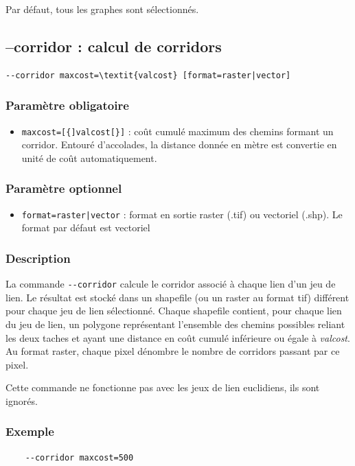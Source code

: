 \documentclass[a4paper,10pt]{report}
\begin{document}
Par défaut, tous les graphes sont sélectionnés.

\subsection{--corridor : calcul de corridors}
\begin{Verbatim}[commandchars=\\\{\}]
--corridor maxcost=\textit{valcost} [format=raster|vector]
\end{Verbatim}

\subsubsection{Paramètre obligatoire}
\begin{itemize}
	\item \verb|maxcost=[{]valcost[}]| : coût cumulé maximum des chemins formant un corridor. Entouré d'accolades, la distance donnée en mètre est convertie en unité de coût automatiquement.
\end{itemize}

\subsubsection{Paramètre optionnel}
\begin{itemize}
	\item \verb+format=raster|vector+ : format en sortie raster (.tif) ou vectoriel (.shp). Le format par défaut est vectoriel
\end{itemize}

\subsubsection{Description}
La commande \verb|--corridor| calcule le corridor associé à chaque lien d'un jeu de lien.
Le résultat est stocké dans un shapefile (ou un raster au format tif) différent pour chaque jeu de lien sélectionné. Chaque shapefile contient, pour chaque lien du jeu de lien, un polygone représentant l'ensemble des chemins possibles reliant les deux taches et ayant une distance en coût cumulé inférieure ou égale à \textit{valcost}.
Au format raster, chaque pixel dénombre le nombre de corridors passant par ce pixel.

Cette commande ne fonctionne pas avec les jeux de lien euclidiens, ils sont ignorés.

\subsubsection{Exemple}
\begin{Verbatim}
	--corridor maxcost=500
\end{Verbatim}
\end{document}
